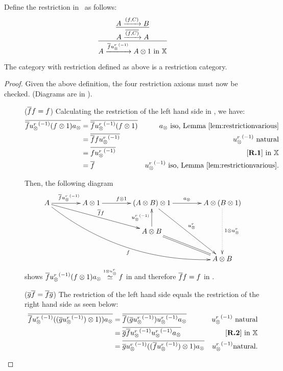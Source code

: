 Define the restriction in \Xt\ as follows:
\[
  \infer{A\xrightarrow{\restr{f}  \inv{u_{\*}^r}} A\*1 \text{ in }\X}
        {\infer{A\xrightarrow{\restr{(f,C)}}A}
               {A\xrightarrow{(f,C)}B}
        }
\]

\begin{lemma}\label{lem:xt_is_a_restriction_category}
  The category \Xt with restriction defined as above is a restriction category.
\end{lemma}
\begin{proof}

  Given the above definition, the four restriction axioms must now be checked. (Diagrams are in \X).
  \begin{description}
    \item[\rone] ($\overline{f} f = f$) Calculating the restriction of the left hand side in
      \X, we have:
      \begin{align*}
        \restr{\rst{f}\inv{\usr} (f\*1) a_{\*}} & = \restr{\rst{f}\inv{\usr} (f\*1)}
          & a_{\*}   \text{ iso, Lemma \ref{lem:restrictionvarious}}\\
        & = \restr{\rst{f}f \inv{\usr}}  & \inv{\usr} \text{ natural}\\
        & = \restr{f \inv{\usr}}  & \text{ \rone in }\X\\
        & = \restr{f } & \inv{\usr}   \text{ iso, Lemma \ref{lem:restrictionvarious}}.
      \end{align*}

      Then, the following diagram
      \[
        \xymatrix @C=40pt @R=25pt{
          A \ar[r]^{\restr{f} \inv{\usr}}
          \ar @/_25pt/[ddrrr]_f  \ar[drr]^{\restr{f}f}
          &A \* 1 \ar[r]^{f\* 1}
          &(A \* B) \* 1 \ar[r]^{a_{\*}} \ar[ddr]^{\usr}
          &A \* (B \* 1) \ar@{.>}[dd]^{1 \* {\usr}}\\
          &&A\*B \ar[u]^{\inv{\usr}} \ar@{=} [dr]\\
          && &A \* B
        }
      \]
      shows $\overline{f}{u_{\otimes}^r}^{(-1)} (f\otimes1) a_{\otimes} \overset{\scriptscriptstyle 1 \otimes {\ensuremath{u_{\otimes}^r}}}{\simeq} f$ in \X and therefore $\overline{f}f
      = f$ in \Xt.


    \item[\rtwo] ($\overline{g} \overline{f} = \overline{f} \overline{g}$) The restriction of the left hand
      side equals the restriction of the right hand side as seen below:
      \begin{align*}
        \restr{\rst{f}\inv{\usr} ((\restr{g}\inv\usr)\*1)) a_{\*}} & = \restr{\rst{f}(\restr{g}\inv\usr)\inv{\usr} a_{\*}} & \inv{\usr}   \text{ natural}\\
        & = \restr{\rst{g}\restr{f}\inv\usr\inv{\usr} a_{\*}} &  \text{\rtwo in }\X\\
        & = \restr{\rst{g}\inv{\usr}((\restr{f}\inv\usr)\*1) a_{\*}} & \inv{\usr}   \text{natural}.
      \end{align*}


\end{description}
\end{proof}
